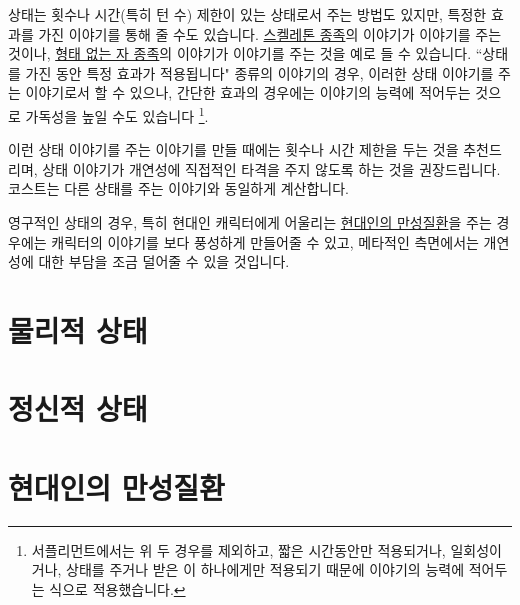 \documentclass{report}
\begin{document}
	상태는 횟수나 시간(특히 턴 수) 제한이 있는 상태로서 주는 방법도 있지만, 특정한 효과를 가진 이야기를 통해 줄 수도 있습니다. \hyperlink{species:skeleton}{스켈레톤 종족}의  이야기가  이야기를 주는 것이나, \hyperlink{species:formless-spawn}{형태 없는 자 종족}의  이야기가  이야기를 주는 것을 예로 들 수 있습니다. ``상태를 가진 동안 특정 효과가 적용됩니다" 종류의 이야기의 경우, 이러한 상태 이야기를 주는 이야기로서 할 수 있으나, 간단한 효과의 경우에는 이야기의 능력에 적어두는 것으로 가독성을 높일 수도 있습니다 \footnote{서플리먼트에서는 위 두 경우를 제외하고, 짧은 시간동안만 적용되거나, 일회성이거나, 상태를 주거나 받은 이 하나에게만 적용되기 때문에 이야기의 능력에 적어두는 식으로 적용했습니다.}.
	
	이런 상태 이야기를 주는 이야기를 만들 때에는 횟수나 시간 제한을 두는 것을 추천드리며, 상태 이야기가 개연성에 직접적인 타격을 주지 않도록 하는 것을 권장드립니다. 코스트는 다른 상태를 주는 이야기와 동일하게 계산합니다.
	
	영구적인 상태의 경우, 특히 현대인 캐릭터에게 어울리는 \hyperlink{status:chronic-diseases}{현대인의 만성질환}을 주는 경우에는 캐릭터의 이야기를 보다 풍성하게 만들어줄 수 있고, 메타적인 측면에서는 개연성에 대한 부담을 조금 덜어줄 수 있을 것입니다.
	
	\section{물리적 상태}
		
	
	\section{정신적 상태}
		
	
	\hypertarget{status:chronic-diseases}{}
	\section{현대인의 만성질환}
		
\end{document}
